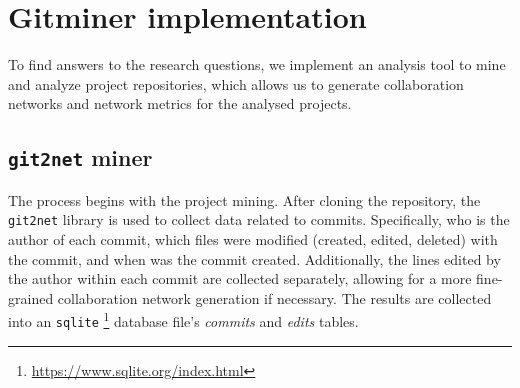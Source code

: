 

\section{Gitminer implementation}
To find answers to the research questions, we implement an analysis tool to mine and analyze project repositories, which allows us to generate collaboration networks and network metrics for the analysed projects. \\

\subsection{\texttt{git2net} miner}
The process begins with the project mining. After cloning the repository, the \texttt{git2net} \cite{goteAnalysingTimeStampedCoEditing2019} library is used to collect data related to commits. Specifically, who is the author of each commit, which files were modified (created, edited, deleted) with the commit, and when was the commit created. Additionally, the lines edited by the author within each commit are collected separately, allowing for a more fine-grained collaboration network generation if necessary. The results are collected into an \texttt{sqlite} \footnote{\href{https://www.sqlite.org/index.html}{https://www.sqlite.org/index.html}} database file's \textit{commits} and \textit{edits} tables. \\

